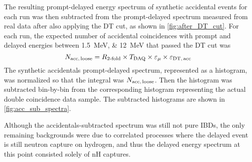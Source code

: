 The resulting prompt-delayed energy spectrum of synthetic accidental events
for each run was then subtracted
from the prompt-delayed spectrum measured from real data
after also applying the DT cut, as shown in \cref{fig:after_DT_cut}.
For each run, the expected number of accidental coincidences
with prompt and delayed energies between \SIlist{1.5;12}{\MeV}
that passed the DT cut was
\begin{equation}
    N_{\text{acc,\,loose}} = R_{\text{\ensuremath{2}-fold}}
        \times T_\text{DAQ}\times \varepsilon_\mu
        \times \varepsilon_{\text{DT,\,acc}}
    \label{eq:nacc_loose}
\end{equation}
The synthetic accidentals prompt-delayed spectrum, represented as a histogram,
was normalized so that the integral was $N_{\text{acc,\,loose}}$.
Then the histogram was subtracted bin-by-bin from the corresponding histogram
representing the actual double coincidence data sample.
The subtracted histograms are shown in \cref{fig:acc_sub_spectra}.


Although the accidentals-subtracted spectrum was still not pure IBDs,
the only remaining backgrounds were due to correlated processes
where the delayed event is still
neutron capture on hydrogen, and thus
the delayed energy spectrum at this point
consisted solely of nH captures.

